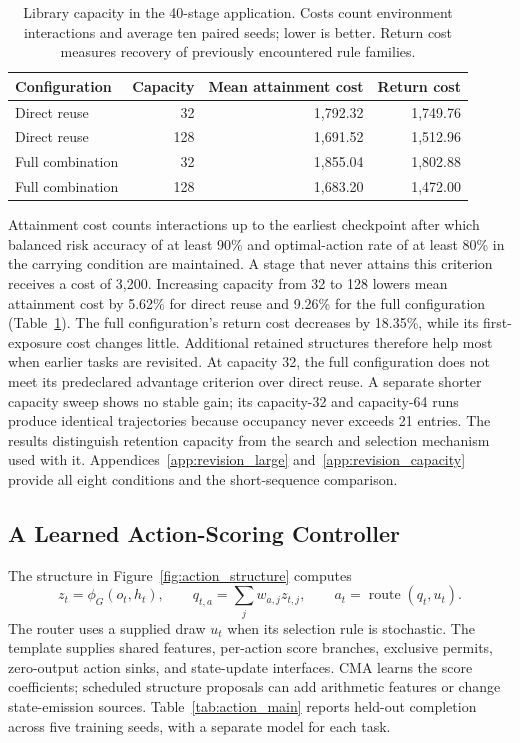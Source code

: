 \begin{table}[tb]
\centering\small
\caption{Library capacity in the 40-stage application. Costs count environment interactions and average ten paired seeds; lower is better. Return cost measures recovery of previously encountered rule families.}
\label{tab:library_main}
\begin{tabular}{lrrr}
\toprule
Configuration & Capacity & Mean attainment cost & Return cost \\
\midrule
Direct reuse & 32 & 1,792.32 & 1,749.76 \\
Direct reuse & 128 & 1,691.52 & 1,512.96 \\
Full combination & 32 & 1,855.04 & 1,802.88 \\
Full combination & 128 & 1,683.20 & 1,472.00 \\
\bottomrule
\end{tabular}
\end{table}

Attainment cost counts interactions up to the earliest checkpoint after which balanced risk accuracy of at least 90\% and optimal-action rate of at least 80\% in the carrying condition are maintained. A stage that never attains this criterion receives a cost of 3,200. Increasing capacity from 32 to 128 lowers mean attainment cost by 5.62\% for direct reuse and 9.26\% for the full configuration (Table~\ref{tab:library_main}). The full configuration's return cost decreases by 18.35\%, while its first-exposure cost changes little. Additional retained structures therefore help most when earlier tasks are revisited. At capacity 32, the full configuration does not meet its predeclared advantage criterion over direct reuse. A separate shorter capacity sweep shows no stable gain; its capacity-32 and capacity-64 runs produce identical trajectories because occupancy never exceeds 21 entries. The results distinguish retention capacity from the search and selection mechanism used with it. Appendices~\ref{app:revision_large} and~\ref{app:revision_capacity} provide all eight conditions and the short-sequence comparison.

\subsection{A Learned Action-Scoring Controller}
The structure in Figure~\ref{fig:action_structure} computes
\begin{equation}
z_t=\phi_G(o_t,h_t),\qquad q_{t,a}=\sum_j w_{a,j}z_{t,j},\qquad
a_t=\operatorname{route}(q_t,u_t).
\end{equation}
The router uses a supplied draw $u_t$ when its selection rule is stochastic. The template supplies shared features, per-action score branches, exclusive permits, zero-output action sinks, and state-update interfaces. CMA learns the score coefficients; scheduled structure proposals can add arithmetic features or change state-emission sources. Table~\ref{tab:action_main} reports held-out completion across five training seeds, with a separate model for each task.

